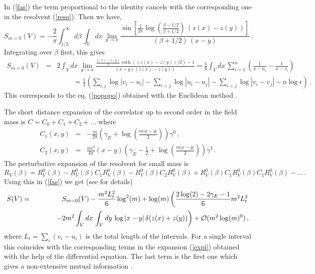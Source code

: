 \documentclass[a4paper]{article}
\begin{document}
 In (\ref{fas}) the term proportional to the identity cancels with the corresponding one in the resolvent (\ref{reso}). Then we have, 
\begin{equation}
S_{m=0}(V)=-\frac{2}{\pi}\int^\infty_{1/2} d\beta\, \int_V dx\, \lim_{y\rightarrow x}  \frac{\sin\left[ \frac{1}{2\pi} \log\left(\frac{\beta-1/2}{\beta+1/2}\right)\, (z(x)-z(y)) \right]}{(\beta+1/2)\,(x-y)}\,.
\end{equation}  
 Integrating over $\beta$ first, this gives
\begin{eqnarray}
S_{m=0}(V)&=&2\int_V dx\, \lim_{y\rightarrow x}  \frac{\frac{z(x)-z(y)}{2}\coth((z(x)-z(y))/2)-1}{(x-y)(z(x)-z(y))}=\frac{1}{6}\int_V dx\,\sum_{i=1}^n \left(\frac{1}{x-u_i}-\frac{1}{x-v_i}\right)\nonumber\\
&\,&\hspace{1cm}=\frac{1}{3} \left( \sum_{i,j}\log|v_i-u_i|-\sum_{i<j} \log|u_i-u_j| -\sum_{i<j} \log|v_i-v_j|-n \log \epsilon \right)\,.\label{sesen}
\end{eqnarray}
 This corresponds to the eq. (\ref{popopo}) obtained with the Euclidean method \cite{fermion}.

The short distance expansion of the correlator up to second order in the field mass is $C=C_0+C_1+C_2+...$ where
\begin{eqnarray}
C_1 (x,y)&=&-\frac{m}{2\pi}\left(\gamma_E+\log\left(\frac{m|x-y|}{2}\right)\right) \gamma^0 \,,\\
C_2 (x,y)&=&\frac{i m^2}{4\pi} (x-y) \left(\gamma_E -\frac{1}{2} +\log\left(\frac{m|x-y|}{2}\right) \right) \gamma^3\,.
\end{eqnarray}
The perturbative expansion of the resolvent for small mass is 
\begin{equation}
R_V(\beta)=R_V^0(\beta)-R_V^0(\beta)C_1 R_V^0(\beta)-R_V^0(\beta)C_2 R_V^0(\beta)+R_V^0(\beta)C_1 R_V^0(\beta)C_1 R_V^0(\beta)-...\,.
\label{financiar}
\end{equation}
Using this in (\ref{fas}) we get (see \cite{futuro} for details)
\begin{eqnarray}
S(V)&=&S_{m=0}(V)-\frac{m^2 L_t^2}{6}  \log^2(m)+\log(m)\left(\frac{2\log(2)-2\gamma_E-1}{6} m^2 L_t^2\right. \\
 &&\hspace{1cm}\left. - 2 m^2  \int_V dx\,\int_V dy\, \log|x-y|\, \delta(z(x)+z(y))\right)+{\cal O}(m^2 \log(m)^0) \nonumber \,,
\end{eqnarray}
where $L_t=\sum_i (v_i-u_i)$ is the total length of the intervals. For a single interval this coincides with the corresponding terms in the expansion (\ref{expi}) obtained with the help of the differential equation. The last term is the first one which gives a non-extensive mutual information \cite{remarks}.
\end{document}
